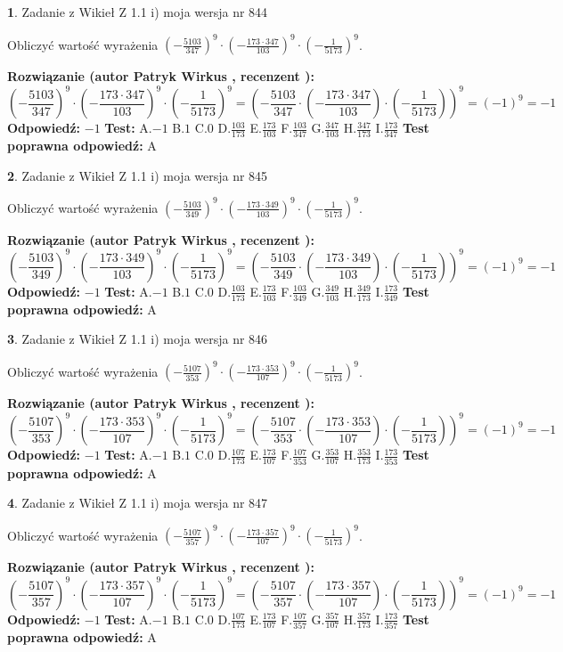 \documentclass[12pt, a4paper]{article}
\theoremstyle{definition} %
\newtheorem{zad}{}
\newcommand{\zadStart}[1]{\begin{zad}#1\newline}
\newcommand{\zadStop}{\end{zad}}
\newcommand{\rozwStart}[2]{\noindent \textbf{Rozwiązanie (autor #1 , recenzent #2): }\newline}
\newcommand{\rozwStop}{\newline}
\newcommand{\odpStart}{\noindent \textbf{Odpowiedź:}\newline}
\newcommand{\odpStop}{\newline}
\newcommand{\testStart}{\noindent \textbf{Test:}\newline}
\newcommand{\testStop}{\newline}
\newcommand{\kluczStart}{\noindent \textbf{Test poprawna odpowiedź:}\newline}
\newcommand{\kluczStop}{\newline}
\begin{document}
\zadStart{Zadanie z Wikieł Z 1.1 i) moja wersja nr 844}

Obliczyć wartość wyrażenia $(-\frac{5103}{347})^{9} \cdot (-\frac{173 \cdot 347}{103})^{9} \cdot (-\frac{1}{5173})^{9}$.
\zadStop
\rozwStart{Patryk Wirkus}{}
$$(-\frac{5103}{347})^{9} \cdot (-\frac{173 \cdot 347}{103})^{9} \cdot (-\frac{1}{5173})^{9} = (-\frac{5103}{347} \cdot (-\frac{173 \cdot 347}{103}) \cdot (-\frac{1}{5173}))^{9} = (-1)^{9} = -1$$
\rozwStop
\odpStart
$-1$
\odpStop
\testStart
A.$-1$ B.$1$ C.$0$ D.$\frac{103}{173}$ E.$\frac{173}{103}$
F.$\frac{103}{347}$ G.$\frac{347}{103}$
H.$\frac{347}{173}$
I.$\frac{173}{347}$
\testStop
\kluczStart
A
\kluczStop



\zadStart{Zadanie z Wikieł Z 1.1 i) moja wersja nr 845}

Obliczyć wartość wyrażenia $(-\frac{5103}{349})^{9} \cdot (-\frac{173 \cdot 349}{103})^{9} \cdot (-\frac{1}{5173})^{9}$.
\zadStop
\rozwStart{Patryk Wirkus}{}
$$(-\frac{5103}{349})^{9} \cdot (-\frac{173 \cdot 349}{103})^{9} \cdot (-\frac{1}{5173})^{9} = (-\frac{5103}{349} \cdot (-\frac{173 \cdot 349}{103}) \cdot (-\frac{1}{5173}))^{9} = (-1)^{9} = -1$$
\rozwStop
\odpStart
$-1$
\odpStop
\testStart
A.$-1$ B.$1$ C.$0$ D.$\frac{103}{173}$ E.$\frac{173}{103}$
F.$\frac{103}{349}$ G.$\frac{349}{103}$
H.$\frac{349}{173}$
I.$\frac{173}{349}$
\testStop
\kluczStart
A
\kluczStop



\zadStart{Zadanie z Wikieł Z 1.1 i) moja wersja nr 846}

Obliczyć wartość wyrażenia $(-\frac{5107}{353})^{9} \cdot (-\frac{173 \cdot 353}{107})^{9} \cdot (-\frac{1}{5173})^{9}$.
\zadStop
\rozwStart{Patryk Wirkus}{}
$$(-\frac{5107}{353})^{9} \cdot (-\frac{173 \cdot 353}{107})^{9} \cdot (-\frac{1}{5173})^{9} = (-\frac{5107}{353} \cdot (-\frac{173 \cdot 353}{107}) \cdot (-\frac{1}{5173}))^{9} = (-1)^{9} = -1$$
\rozwStop
\odpStart
$-1$
\odpStop
\testStart
A.$-1$ B.$1$ C.$0$ D.$\frac{107}{173}$ E.$\frac{173}{107}$
F.$\frac{107}{353}$ G.$\frac{353}{107}$
H.$\frac{353}{173}$
I.$\frac{173}{353}$
\testStop
\kluczStart
A
\kluczStop



\zadStart{Zadanie z Wikieł Z 1.1 i) moja wersja nr 847}

Obliczyć wartość wyrażenia $(-\frac{5107}{357})^{9} \cdot (-\frac{173 \cdot 357}{107})^{9} \cdot (-\frac{1}{5173})^{9}$.
\zadStop
\rozwStart{Patryk Wirkus}{}
$$(-\frac{5107}{357})^{9} \cdot (-\frac{173 \cdot 357}{107})^{9} \cdot (-\frac{1}{5173})^{9} = (-\frac{5107}{357} \cdot (-\frac{173 \cdot 357}{107}) \cdot (-\frac{1}{5173}))^{9} = (-1)^{9} = -1$$
\rozwStop
\odpStart
$-1$
\odpStop
\testStart
A.$-1$ B.$1$ C.$0$ D.$\frac{107}{173}$ E.$\frac{173}{107}$
F.$\frac{107}{357}$ G.$\frac{357}{107}$
H.$\frac{357}{173}$
I.$\frac{173}{357}$
\testStop
\kluczStart
A
\kluczStop
\end{document}
